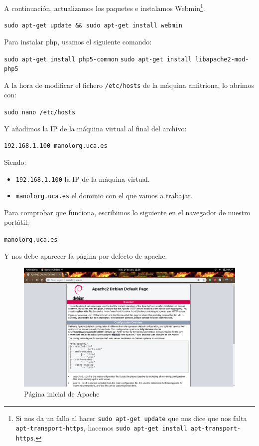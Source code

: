 \documentclass[12pt,letterpaper]{article}
\begin{document}
A continuación, actualizamos los paquetes e instalamos Webmin\footnote{Si nos da un fallo al hacer \texttt{sudo apt-get update} que nos dice que nos falta \texttt{apt-transport-https}, hacemos \texttt{sudo apt-get install apt-transport-https}.}.
\begin{center}
	\texttt{sudo apt-get update \&\& sudo apt-get install webmin}
\end{center}

Para instalar php, usamos el siguiente comando:
\begin{center}
	\texttt{sudo apt-get install php5-common}
	\texttt{sudo apt-get install libapache2-mod-php5}
\end{center}

A la hora de modificar el fichero \texttt{/etc/hosts} de la máquina anfitriona, lo abrimos con:
\begin{center}
	\texttt{sudo nano /etc/hosts}
\end{center}

Y añadimos la IP de la máquina virtual al final del archivo:
\begin{center}
	\texttt{192.168.1.100 manolorg.uca.es}
\end{center}

Siendo:
\begin{itemize}
	\item \texttt{192.168.1.100} la IP de la máquina virtual.
	\item \texttt{manolorg.uca.es} el dominio con el que vamos a trabajar.
\end{itemize}

Para comprobar que funciona, escribimos lo siguiente en el navegador de nuestro portátil:
\begin{center}
	\texttt{manolorg.uca.es}
\end{center}
\newpage
Y nos debe aparecer la página por defecto de apache.
\begin{figure}[h]
	\centering
	\includegraphics[scale=0.34]{Apache.png}
	\caption{Página inicial de Apache}
	\label{Página inicial de Apache}
\end{figure}
\end{document}
